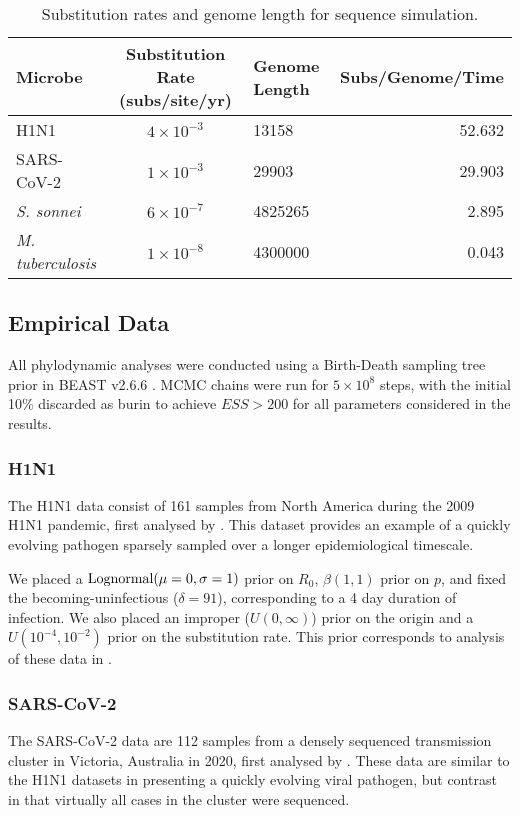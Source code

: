 \documentclass{article}
\begin{document}
\begin{spacing}{1.5}
\begin{table}[ht]
    \centering
    \caption{Substitution rates and genome length for sequence simulation.}
    \begin{tabular}{l|c|l|r}
    \hline
    Microbe                     &   Substitution Rate (subs/site/yr) & Genome Length & Subs/Genome/Time  \\
    \hline
    H1N1                        & $4\times10^{-3}$ & 13158 & 52.632\\
    SARS-CoV-2                  & $1\times10^{-3}$ & 29903 & 29.903\\
    \textit{S. sonnei}    & $6\times10^{-7}$ & 4825265  & 2.895\\
    \textit{M. tuberculosis}    &   $1\times10^{-8}$ & 4300000 & 0.043\\
    \hline
    \end{tabular}
    \label{tab:seq_parms}
\end{table}

\subsection*{Empirical Data}
All phylodynamic analyses were conducted using a Birth-Death sampling tree prior in BEAST v2.6.6 \citep{bouckaert_beast_2019}. MCMC chains were run for $5\times10^{8}$ steps, with the initial 10\% discarded as burin to achieve $ESS > 200$ for all parameters considered in the results.

\subsubsection*{H1N1}
The H1N1 data consist of 161 samples from North America during the 2009 H1N1 pandemic, first analysed by \citet{hedge_2013_real-time}. This  dataset provides an example of a quickly evolving pathogen sparsely sampled over a longer epidemiological timescale. 

We placed a $\textnormal{Lognormal}(\mu=0,\sigma=1)$ prior on $R_0$, $\beta(1,1)$ prior on $p$, and fixed the becoming-uninfectious ($\delta = 91$), corresponding to a 4 day duration of infection. We also placed an improper ($U(0,\infty)$) prior on the origin and a $U(10^{-4},10^{-2})$ prior on the substitution rate. This prior corresponds to analysis of these data in \citet{featherstone_decoding_2023}.

\subsubsection*{SARS-CoV-2}
The SARS-CoV-2 data are 112 samples from a densely sequenced transmission cluster in Victoria, Australia in 2020, first analysed by \citet{lane2021genomics}. These data are similar to the H1N1 datasets in presenting a quickly evolving viral pathogen, but contrast in that virtually all cases in the cluster were sequenced. 


\end{spacing}
\end{document}
